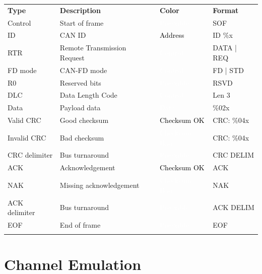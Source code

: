 \begin{tabularx}{16cm}{lllX}
\thickhline
\textbf{Type} & \textbf{Description} & \textbf{Color} & \textbf{Format} \\
\thickhline
Control & Start of frame & \cellcolor{preamble}\textcolor{white}{Preamble} & SOF \\
\thickhline
ID & CAN ID & \cellcolor{address}\textcolor{black}{Address} & ID \%x \\
\thickhline
RTR & Remote Transmission Request & \cellcolor{control}\textcolor{white}{Control} & DATA | REQ \\
\thickhline
FD mode & CAN-FD mode & \cellcolor{control}\textcolor{white}{Control} & FD | STD\\
\thickhline
R0 & Reserved bits & \cellcolor{preamble}\textcolor{white}{Preamble} & RSVD \\
\thickhline
DLC & Data Length Code & \cellcolor{control}\textcolor{white}{Control} & Len 3 \\
\thickhline
Data & Payload data & \cellcolor{data}\textcolor{white}{Data} & \%02x \\
\thickhline
Valid CRC & Good checksum & \cellcolor{checksumok}\textcolor{black}{Checksum OK} & CRC: \%04x \\
\thickhline
Invalid CRC & Bad checksum & \cellcolor{checksumbad}\textcolor{white}{Checksum Bad} & CRC: \%04x \\
\thickhline
CRC delimiter & Bus turnaround & \cellcolor{preamble}\textcolor{white}{Preamble} & CRC DELIM \\
\thickhline
ACK & Acknowledgement & \cellcolor{checksumok}\textcolor{black}{Checksum OK} & ACK \\
\thickhline
NAK & Missing acknowledgement & \cellcolor{checksumbad}\textcolor{white}{Checksum Bad} & NAK \\
\thickhline
ACK delimiter & Bus turnaround & \cellcolor{preamble}\textcolor{white}{Preamble} & ACK DELIM \\
\thickhline
EOF & End of frame & \cellcolor{preamble}\textcolor{white}{Preamble} & EOF \\

\thickhline
\end{tabularx}

\pagebreak
\section{Channel Emulation}
\label{filter:channelemu}

